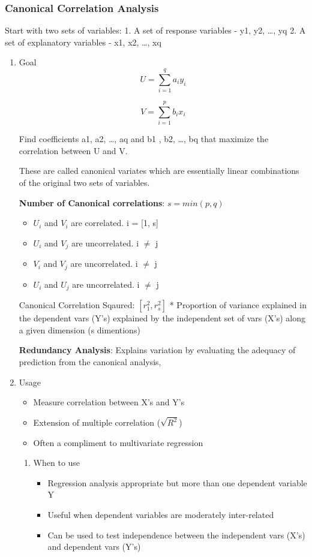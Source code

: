\documentclass[11pt]{article}
\begin{document}
\subsubsection{Canonical Correlation Analysis}
\label{sec:orgd7027c9}
Start with two sets of variables: 1. A set of response variables - y1,
y2, \ldots{}, yq 2. A set of explanatory variables - x1, x2, \ldots{}, xq

\begin{enumerate}
\item Goal
\label{sec:org758b7a6}
$$
    U = \sum_{i = 1}^q a_i y_i
$$

$$
   V = \sum_{i = 1}^p b_i x_i
$$

Find coefficients a1, a2, \ldots{}, aq and b1 , b2, \ldots{}, bq that maximize the
correlation between U and V.

These are called canonical variates which are essentially linear
combinations of the original two sets of variables.

\textbf{Number of Canonical correlations}: \(s = min(p, q)\)

\begin{itemize}
\item \(U_i\) and \(V_i\) are correlated. i = [1, s]
\item \(U_i\) and \(V_j\) are uncorrelated. i \(\ne\) j
\item \(V_i\) and \(V_j\) are uncorrelated. i \(\ne\) j
\item \(U_i\) and \(U_j\) are uncorrelated. i \(\ne\) j
\end{itemize}

Canonical Correlation Sqaured: \([r_1^2, r_s^2]\) * Proportion of variance
explained in the dependent vars (Y's) explained by the independent set
of vars (X's) along a given dimension (s dimentions)

\textbf{Redundancy Analysis}: Explains variation by evaluating the adequacy of
prediction from the canonical analysis,

\item Usage
\label{sec:org7a6024d}
\begin{itemize}
\item Measure correlation between X's and Y's
\item Extension of multiple correlation (\(\sqrt{R^2}\))
\item Often a compliment to multivariate regression
\end{itemize}

\begin{enumerate}
\item When to use
\label{sec:orga8c03c0}
\begin{itemize}
\item Regression analysis appropriate but more than one dependent variable
Y
\item Useful when dependent variables are moderately inter-related
\item Can be used to test independence between the independent vars (X's)
and dependent vars (Y's)
\end{itemize}
\end{enumerate}


\end{enumerate}
\end{document}

